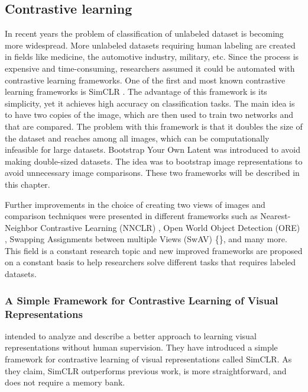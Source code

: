 \documentclass[
]{krantz}
\begin{document}
\hypertarget{contrastive-learning}{%
\subsection{Contrastive learning}\label{contrastive-learning}}

In recent years the problem of classification of unlabeled dataset is becoming more widespread. More unlabeled datasets requiring human labeling are created in fields like medicine, the automotive industry, military, etc. Since the process is expensive and time-consuming, researchers assumed it could be automated with contrastive learning frameworks. One of the first and most known contrastive learning frameworks is SimCLR \citep{SimCLR}. The advantage of this framework is its simplicity, yet it achieves high accuracy on classification tasks. The main idea is to have two copies of the image, which are then used to train two networks and that are compared. The problem with this framework is that it doubles the size of the dataset and reaches among all images, which can be computationally infeasible for large datasets. Bootstrap Your Own Latent \citep{BYOL} was introduced to avoid making double-sized datasets. The idea was to bootstrap image representations to avoid unnecessary image comparisons. These two frameworks will be described in this chapter.

Further improvements in the choice of creating two views of images and comparison techniques were presented in different frameworks such as Nearest-Neighbor Contrastive Learning (NNCLR) \citep{NNCLR}, Open World Object Detection (ORE) \citep{ORE}, Swapping Assignments between multiple Views (SwAV) \{\citet{SwAV}\}, and many more.
This field is a constant research topic and new improved frameworks are proposed on a constant basis to help researchers solve different tasks that requires labeled datasets.

\hypertarget{a-simple-framework-for-contrastive-learning-of-visual-representations}{%
\subsubsection{A Simple Framework for Contrastive Learning of Visual Representations}\label{a-simple-framework-for-contrastive-learning-of-visual-representations}}

\citet{SimCLR} intended to analyze and describe a better approach to learning visual representations without human supervision. They have introduced a simple framework for contrastive learning of visual representations called SimCLR. As they claim, SimCLR outperforms previous work, is more straightforward, and does not require a memory bank.
\end{document}
